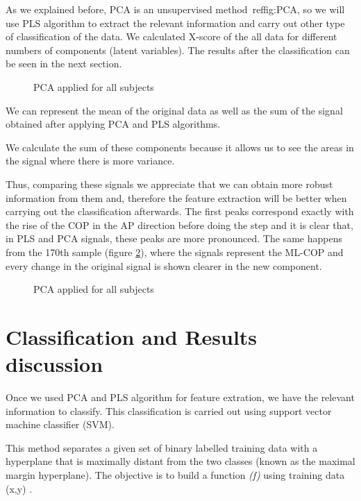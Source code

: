 As we explained before, PCA is an unsupervised method\ ref{fig:PCA}, so we will use PLS algorithm to extract the relevant information and carry out other type of classification of the data. We calculated X-score of the all data for different numbers of components (latent variables). The results after the classification can be seen in the next section.

\begin{figure}[H]
	\centering
	\caption{PCA applied for all subjects}
	\label{fig:PCA}
\end{figure}

We can represent the mean of the original data as well as the sum of the signal obtained after applying PCA and PLS algorithms.

We calculate the sum of these components because it allows us to see the areas in the signal where there is more variance.

Thus, comparing these signals we appreciate that we can obtain more robust information from them and, therefore the feature extraction will be better when carrying out the classification afterwards. The first peaks correspond exactly with the rise of the COP in the AP direction before doing the step and it is clear that, in PLS and PCA signals, these peaks are more pronounced. The same happens from the 170th sample (figure \ref{fig:OrigPCAPLS}), where the signals represent the ML-COP and every change in the original signal is shown clearer in the new component.

\begin{figure}[H]
	\centering
	\caption{PCA applied for all subjects}
	\label{fig:OrigPCAPLS}
\end{figure}

\section{Classification and Results discussion}

Once we used PCA and PLS algorithm for feature extration, we have the relevant information to classify. This classification is carried out using support vector machine classifier (SVM).

This method separates a given set of binary labelled training data with a hyperplane that is maximally distant from the two classes (known as the maximal margin hyperplane). The objective is to build a function \textit{(f)} using training data (x,y) \cite{Gorriz}.
 
